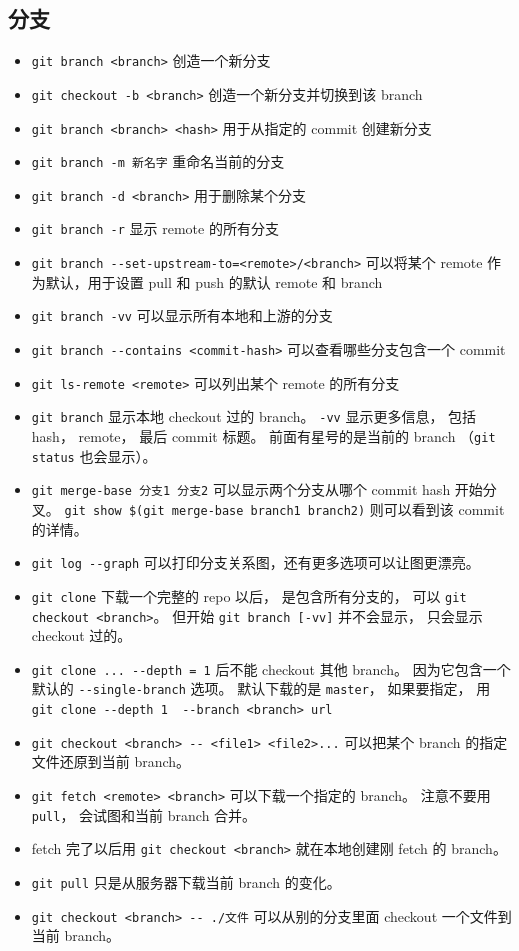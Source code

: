 \subsection{分支}
\begin{itemize}
\item \verb`git branch <branch>` 创造一个新分支
\item \verb`git checkout -b <branch>` 创造一个新分支并切换到该 branch
\item \verb`git branch <branch> <hash>` 用于从指定的 commit 创建新分支
\item \verb`git branch -m 新名字` 重命名当前的分支
\item \verb`git branch -d <branch>` 用于删除某个分支
\item \verb`git branch -r` 显示 remote 的所有分支
\item \verb`git branch --set-upstream-to=<remote>/<branch>` 可以将某个 remote 作为默认，用于设置 pull 和 push 的默认 remote 和 branch
\item \verb`git branch -vv` 可以显示所有本地和上游的分支
\item \verb`git branch --contains <commit-hash>` 可以查看哪些分支包含一个 commit
\item \verb`git ls-remote <remote>` 可以列出某个 remote 的所有分支
\item \verb`git branch` 显示本地 checkout 过的 branch。 \verb`-vv` 显示更多信息， 包括 hash， remote， 最后 commit 标题。 前面有星号的是当前的 branch （\verb`git status` 也会显示）。
\item \verb`git merge-base 分支1 分支2` 可以显示两个分支从哪个 commit hash 开始分叉。 \verb`git show $(git merge-base branch1 branch2)` 则可以看到该 commit 的详情。
\item \verb`git log --graph` 可以打印分支关系图，还有更多选项可以让图更漂亮。
\item \verb`git clone` 下载一个完整的 repo 以后， 是包含所有分支的， 可以 \verb`git checkout <branch>`。 但开始 \verb`git branch [-vv]` 并不会显示， 只会显示 checkout 过的。
\item \verb`git clone ... --depth = 1` 后不能 checkout 其他 branch。 因为它包含一个默认的 \verb`--single-branch` 选项。 默认下载的是 \verb`master`， 如果要指定， 用 \verb`git clone --depth 1  --branch <branch> url`
\item \verb`git checkout <branch> -- <file1> <file2>...` 可以把某个 branch 的指定文件还原到当前 branch。
\item \verb`git fetch <remote> <branch>` 可以下载一个指定的 branch。 注意不要用 \verb`pull`， 会试图和当前 branch 合并。
\item fetch 完了以后用 \verb`git checkout <branch>` 就在本地创建刚 fetch 的 branch。
\item \verb`git pull` 只是从服务器下载当前 branch 的变化。
\item \verb`git checkout <branch> -- ./文件` 可以从别的分支里面 checkout 一个文件到当前 branch。


\end{itemize}

